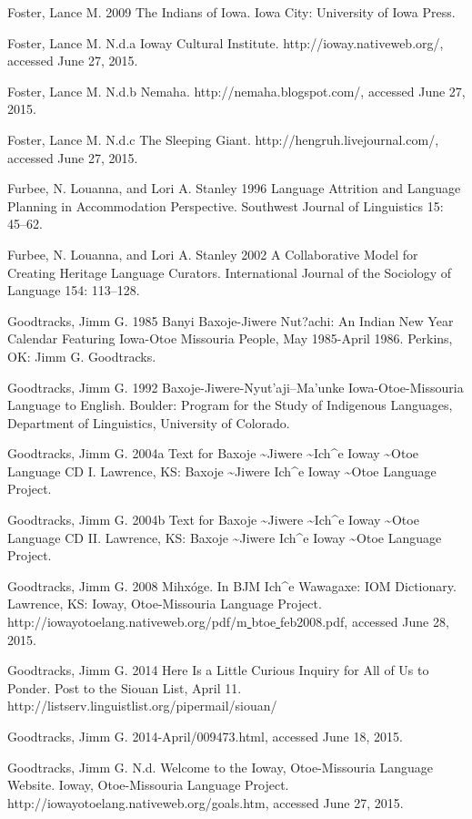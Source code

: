 \documentclass[output=paper]{LSP/langsci}
\begin{document}
\begin{reflist}
Foster, Lance M. 2009 The Indians of Iowa. Iowa City: University of Iowa Press.

Foster, Lance M. N.d.a Ioway Cultural Institute. http://ioway.nativeweb.org/, accessed June 27, 2015.

Foster, Lance M. N.d.b Nemaha. http://nemaha.blogspot.com/, accessed June 27, 2015.

Foster, Lance M. N.d.c The Sleeping Giant. http://hengruh.livejournal.com/, accessed June 27, 2015.

Furbee, N. Louanna, and Lori A. Stanley 1996 Language Attrition and Language Planning in Accommodation Perspective. Southwest Journal of Linguistics 15: 45--62.

Furbee, N. Louanna, and Lori A. Stanley 2002 A Collaborative Model for Creating Heritage Language Curators. International Journal of the Sociology of Language 154: 113--128.

Goodtracks, Jimm G. 1985 Banyi Baxoje-Jiwere Nut?achi: An Indian New Year Calendar Featuring Iowa-Otoe Missouria People, May 1985-April 1986. Perkins, OK: Jimm G. Goodtracks.

Goodtracks, Jimm G. 1992 Baxoje-Jiwere-Nyut'aji--Ma'unke Iowa-Otoe-Missouria Language to English. Boulder: Program for the Study of Indigenous Languages, Department of Linguistics, University of Colorado.

Goodtracks, Jimm G. 2004a Text for Baxoje \textasciitilde Jiwere \textasciitilde Ich\^{ }e Ioway \textasciitilde Otoe Language CD I. Lawrence, KS: Baxoje \textasciitilde Jiwere Ich\^{ }e Ioway \textasciitilde Otoe Language Project.

Goodtracks, Jimm G. 2004b Text for Baxoje \textasciitilde Jiwere \textasciitilde Ich\^{ }e Ioway \textasciitilde Otoe Language CD II. Lawrence, KS: Baxoje \textasciitilde Jiwere Ich\^{ }e Ioway \textasciitilde Otoe Language Project.

Goodtracks, Jimm G. 2008 Mihxóge. In BJM Ich\^{ }e Wawagaxe: IOM Dictionary. Lawrence, KS: Ioway, Otoe-Missouria Language Project. http://iowayotoelang.nativeweb.org/pdf/m\underline{ }btoe\underline{ }feb2008.pdf, accessed June 28, 2015.

Goodtracks, Jimm G. 2014 Here Is a Little Curious Inquiry for All of Us to Ponder. Post to the Siouan List, April 11. http://listserv.linguistlist.org/pipermail/siouan/

Goodtracks, Jimm G. 2014-April/009473.html, accessed June 18, 2015.

Goodtracks, Jimm G. N.d. Welcome to the Ioway, Otoe-Missouria Language Website. Ioway, Otoe-Missouria Language Project. http://iowayotoelang.nativeweb.org/goals.htm, accessed June 27, 2015.


\end{reflist}
\end{document}
